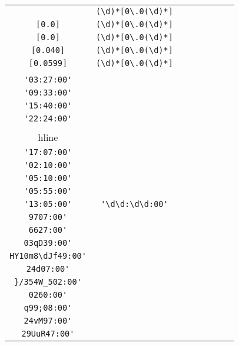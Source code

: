\begin{longtable}{cccccccc}
\begin{tabular}{ll}
    \verb|[0.079]| & \verb|(\d)*[0\.0(\d)*]|\\
\verb|[0.0]| & \verb|(\d)*[0\.0(\d)*]|\\
\verb|[0.0]| & \verb|(\d)*[0\.0(\d)*]|\\
\verb|[0.040]| & \verb|(\d)*[0\.0(\d)*]|\\
\verb|[0.0599]| & \verb|(\d)*[0\.0(\d)*]|
\end{tabular}
\\\midrule 
\begin{tabular}{l}
    \verb|'02:13:00'|\\
\verb|'03:27:00'|\\
\verb|'09:33:00'|\\
\verb|'15:40:00'|\\
\verb|'22:24:00'|\\
\\hline\\
\verb|'17:07:00'|\\
\verb|'02:10:00'|\\
\verb|'05:10:00'|\\
\verb|'05:55:00'|\\
\verb|'13:05:00'|
\end{tabular}

&
\verb|'\d\d:\d\d:00'|
&

\begin{tabular}{l}
    \verb|(.)*\d\d(.)*\d\d:00'|\\
\verb|9707:00'|\\
\verb|6627:00'|\\
\verb|03qD39:00'|\\
\verb|HY10m8\dJf49:00'|\\
\verb|24d07:00'|
\end{tabular}

&

\begin{tabular}{l}
    \verb|(.)*\d\d(.)*\d\d:00'|\\
\verb|}/354W_502:00'|\\
\verb|0260:00'|\\
\verb|q99;08:00'|\\
\verb|24vM97:00'|\\
\verb|29UuR47:00'|
\end{tabular}

&


\end{longtable}
